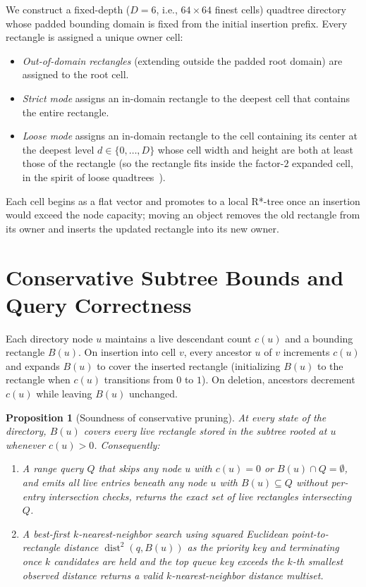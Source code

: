 \documentclass[10pt,letterpaper]{article}
\newtheorem{proposition}{Proposition}
\begin{document}
We construct a fixed-depth ($D = 6$, i.e., $64 \times 64$ finest cells) quadtree directory whose padded bounding domain is fixed from the initial insertion prefix. Every rectangle is assigned a unique owner cell:
\begin{itemize}
\item \emph{Out-of-domain rectangles} (extending outside the padded root domain) are assigned to the root cell.
\item \emph{Strict mode} assigns an in-domain rectangle to the deepest cell that contains the entire rectangle.
\item \emph{Loose mode} assigns an in-domain rectangle to the cell containing its center at the deepest level $d \in \{0,\dots,D\}$ whose cell width and height are both at least those of the rectangle (so the rectangle fits inside the factor-$2$ expanded cell, in the spirit of loose quadtrees~\cite{samet2013}).
\end{itemize}
Each cell begins as a flat vector and promotes to a local R*-tree once an insertion would exceed the node capacity; moving an object removes the old rectangle from its owner and inserts the updated rectangle into its new owner.

\section{Conservative Subtree Bounds and Query Correctness}

Each directory node $u$ maintains a live descendant count $c(u)$ and a bounding rectangle $B(u)$. On insertion into cell $v$, every ancestor $u$ of $v$ increments $c(u)$ and expands $B(u)$ to cover the inserted rectangle (initializing $B(u)$ to the rectangle when $c(u)$ transitions from $0$ to $1$). On deletion, ancestors decrement $c(u)$ while leaving $B(u)$ unchanged.

\begin{proposition}[Soundness of conservative pruning]
At every state of the directory, $B(u)$ covers every live rectangle stored in the subtree rooted at $u$ whenever $c(u) > 0$. Consequently:
\begin{enumerate}
\item A range query $Q$ that skips any node $u$ with $c(u) = 0$ or $B(u) \cap Q = \emptyset$, and emits all live entries beneath any node $u$ with $B(u) \subseteq Q$ without per-entry intersection checks, returns the exact set of live rectangles intersecting $Q$.
\item A best-first $k$-nearest-neighbor search using squared Euclidean point-to-rectangle distance $\operatorname{dist}^2(q, B(u))$ as the priority key and terminating once $k$ candidates are held and the top queue key exceeds the $k$-th smallest observed distance returns a valid $k$-nearest-neighbor distance multiset.
\end{enumerate}
\end{proposition}
\end{document}
